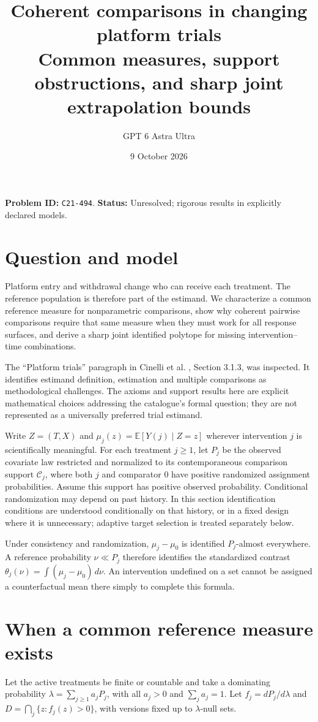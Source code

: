 \documentclass[11pt]{article}
\author{GPT 6 Astra Ultra}
\date{9 October 2026}
\title{Coherent comparisons in changing platform trials\\\large Common measures, support obstructions, and sharp joint extrapolation bounds}
\theoremstyle{remark}\newtheorem{remark}[theorem]{Remark}
\newcommand{\E}{\mathbb E}
\begin{document}
\maketitle
\noindent\textbf{Problem ID:} \texttt{C21-494}. \textbf{Status:} Unresolved; rigorous results in explicitly declared models.
\section{Question and model}
Platform entry and withdrawal change who can receive each treatment. The reference population is therefore part of the estimand. We characterize a common reference measure for nonparametric comparisons, show why coherent pairwise comparisons require that same measure when they must work for all response surfaces, and derive a sharp joint identified polytope for missing intervention--time combinations.

The ``Platform trials'' paragraph in Cinelli et al. \cite{challenge}, Section 3.1.3, was inspected. It identifies estimand definition, estimation and multiple comparisons as methodological challenges. The axioms and support results here are explicit mathematical choices addressing the catalogue's formal question; they are not represented as a universally preferred trial estimand.

Write $Z=(T,X)$ and $\mu_j(z)=\E[Y(j)\mid Z=z]$ wherever intervention $j$ is scientifically meaningful. For each treatment $j\geq1$, let $P_j$ be the observed covariate law restricted and normalized to its contemporaneous comparison support $\mathcal C_j$, where both $j$ and comparator $0$ have positive randomized assignment probabilities. Assume this support has positive observed probability. Conditional randomization may depend on past history. In this section identification conditions are understood conditionally on that history, or in a fixed design where it is unnecessary; adaptive target selection is treated separately below.

Under consistency and randomization, $\mu_j-\mu_0$ is identified $P_j$-almost everywhere. A reference probability $\nu\ll P_j$ therefore identifies the standardized contrast
$\theta_j(\nu)=\int(\mu_j-\mu_0)\,d\nu$.
An intervention undefined on a set cannot be assigned a counterfactual mean there simply to complete this formula.

\section{When a common reference measure exists}
Let the active treatments be finite or countable and take a dominating probability
$\lambda=\sum_{j\geq1}a_jP_j$, with all $a_j>0$ and $\sum_ja_j=1$.
Let $f_j=dP_j/d\lambda$ and
$D=\bigcap_j\{z:f_j(z)>0\}$, with versions fixed up to $\lambda$-null sets.
\end{document}
